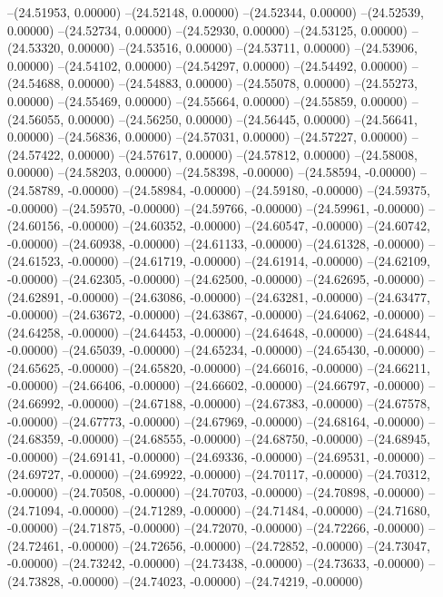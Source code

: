 --(24.51953, 0.00000)
--(24.52148, 0.00000)
--(24.52344, 0.00000)
--(24.52539, 0.00000)
--(24.52734, 0.00000)
--(24.52930, 0.00000)
--(24.53125, 0.00000)
--(24.53320, 0.00000)
--(24.53516, 0.00000)
--(24.53711, 0.00000)
--(24.53906, 0.00000)
--(24.54102, 0.00000)
--(24.54297, 0.00000)
--(24.54492, 0.00000)
--(24.54688, 0.00000)
--(24.54883, 0.00000)
--(24.55078, 0.00000)
--(24.55273, 0.00000)
--(24.55469, 0.00000)
--(24.55664, 0.00000)
--(24.55859, 0.00000)
--(24.56055, 0.00000)
--(24.56250, 0.00000)
--(24.56445, 0.00000)
--(24.56641, 0.00000)
--(24.56836, 0.00000)
--(24.57031, 0.00000)
--(24.57227, 0.00000)
--(24.57422, 0.00000)
--(24.57617, 0.00000)
--(24.57812, 0.00000)
--(24.58008, 0.00000)
--(24.58203, 0.00000)
--(24.58398, -0.00000)
--(24.58594, -0.00000)
--(24.58789, -0.00000)
--(24.58984, -0.00000)
--(24.59180, -0.00000)
--(24.59375, -0.00000)
--(24.59570, -0.00000)
--(24.59766, -0.00000)
--(24.59961, -0.00000)
--(24.60156, -0.00000)
--(24.60352, -0.00000)
--(24.60547, -0.00000)
--(24.60742, -0.00000)
--(24.60938, -0.00000)
--(24.61133, -0.00000)
--(24.61328, -0.00000)
--(24.61523, -0.00000)
--(24.61719, -0.00000)
--(24.61914, -0.00000)
--(24.62109, -0.00000)
--(24.62305, -0.00000)
--(24.62500, -0.00000)
--(24.62695, -0.00000)
--(24.62891, -0.00000)
--(24.63086, -0.00000)
--(24.63281, -0.00000)
--(24.63477, -0.00000)
--(24.63672, -0.00000)
--(24.63867, -0.00000)
--(24.64062, -0.00000)
--(24.64258, -0.00000)
--(24.64453, -0.00000)
--(24.64648, -0.00000)
--(24.64844, -0.00000)
--(24.65039, -0.00000)
--(24.65234, -0.00000)
--(24.65430, -0.00000)
--(24.65625, -0.00000)
--(24.65820, -0.00000)
--(24.66016, -0.00000)
--(24.66211, -0.00000)
--(24.66406, -0.00000)
--(24.66602, -0.00000)
--(24.66797, -0.00000)
--(24.66992, -0.00000)
--(24.67188, -0.00000)
--(24.67383, -0.00000)
--(24.67578, -0.00000)
--(24.67773, -0.00000)
--(24.67969, -0.00000)
--(24.68164, -0.00000)
--(24.68359, -0.00000)
--(24.68555, -0.00000)
--(24.68750, -0.00000)
--(24.68945, -0.00000)
--(24.69141, -0.00000)
--(24.69336, -0.00000)
--(24.69531, -0.00000)
--(24.69727, -0.00000)
--(24.69922, -0.00000)
--(24.70117, -0.00000)
--(24.70312, -0.00000)
--(24.70508, -0.00000)
--(24.70703, -0.00000)
--(24.70898, -0.00000)
--(24.71094, -0.00000)
--(24.71289, -0.00000)
--(24.71484, -0.00000)
--(24.71680, -0.00000)
--(24.71875, -0.00000)
--(24.72070, -0.00000)
--(24.72266, -0.00000)
--(24.72461, -0.00000)
--(24.72656, -0.00000)
--(24.72852, -0.00000)
--(24.73047, -0.00000)
--(24.73242, -0.00000)
--(24.73438, -0.00000)
--(24.73633, -0.00000)
--(24.73828, -0.00000)
--(24.74023, -0.00000)
--(24.74219, -0.00000)
